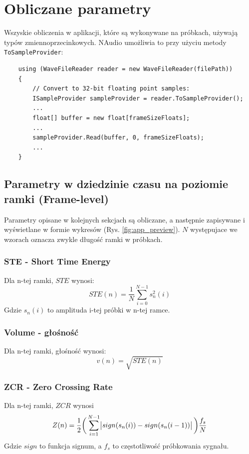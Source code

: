 \documentclass[12pt,a4paper]{article}
\begin{document}
\section{Obliczane parametry\label{sec:parametry}}
Wszyskie obliczenia w aplikacji, które są wykonywane na próbkach, używają typów zmiennoprzecinkowych.
NAudio umożliwia to przy użyciu metody \verb|ToSampleProvider|:

\begin{verbatim}
    using (WaveFileReader reader = new WaveFileReader(filePath))
    {
        // Convert to 32-bit floating point samples:
        ISampleProvider sampleProvider = reader.ToSampleProvider();
        ...
        float[] buffer = new float[frameSizeFloats];
        ...
        sampleProvider.Read(buffer, 0, frameSizeFloats);
        ...
    }
\end{verbatim}

\subsection{Parametry w dziedzinie czasu na poziomie ramki (Frame-level)\label{sec:framelevel}}
Parametry opisane w kolejnych sekcjach są obliczane, a następnie zapisywane i wyświetlane w formie wykresów (Rys. \ref{fig:app_preview}). $N$ występujace we wzorach oznacza zwykle długość ramki w próbkach.

\subsubsection{STE - Short Time Energy\label{sec:ste}}
Dla n-tej ramki, $STE$ wynosi:
\begin{equation}
    STE(n)=\frac{1}{N}\sum_{i=0}^{N-1}s_n^2(i)
\end{equation}
Gdzie $s_n(i)$ to amplituda i-tej próbki w n-tej ramce.

\subsubsection{Volume - głośność\label{sec:volume}}
Dla n-tej ramki, głośność wynosi:
\begin{equation}
    v(n)=\sqrt{STE(n)}
\end{equation}

\subsubsection{ZCR - Zero Crossing Rate\label{sec:zcr}}
Dla n-tej ramki, $ZCR$ wynosi
\begin{equation}
    Z(n)=\frac{1}{2}\bigg(
        \sum_{i=1}^{N-1} \abs{sign(s_n(i))-sign(s_n(i-1))}
    \bigg)\frac{f_s}{N}
\end{equation}
Gdzie $sign$ to funkcja signum, a $f_s$ to częstotliwość próbkowania sygnału.
\end{document}

